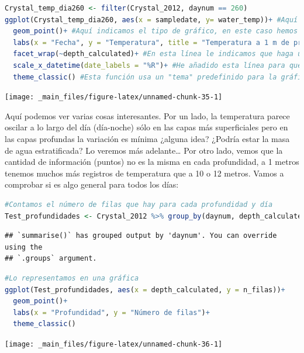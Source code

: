 \documentclass[
]{book}
\begin{document}
\begin{lstlisting}[language=R]
Crystal_temp_dia260 <- filter(Crystal_2012, daynum == 260)
ggplot(Crystal_temp_dia260, aes(x = sampledate, y= water_temp))+ #Aquí indicamos donde está la información que queremos representar (Crystal_2012) y que variables x e y
  geom_point()+ #Aquí indicamos el tipo de gráfico, en este caso hemos elegido puntos
  labs(x = "Fecha", y = "Temperatura", title = "Temperatura a 1 m de profundidad")+ #Aquí  podemos modificar las etiquetas del gráfico.
  facet_wrap(~depth_calculated)+ #En esta línea le indicamos que haga una gráfica por cada profundidad.
  scale_x_datetime(date_labels = "%R")+ #He añadido esta línea para que el formato de la fecha ponga solo la hora.
  theme_classic() #Esta función usa un "tema" predefinido para la gráfica
\end{lstlisting}

\texttt{[image: \_main\_files/figure-latex/unnamed-chunk-35-1]}

Aquí podemos ver varias cosas interesantes. Por un lado, la temperatura parece oscilar a lo largo del día (día-noche) sólo en las capas más superficiales pero en las capas profundas la variación es mínima ¿alguna idea? ¿Podría estar la masa de agua estratificada? Lo veremos más adelante\ldots{} Por otro lado, vemos que la cantidad de información (puntos) no es la misma en cada profundidad, a 1 metros tenemos muchos más registros de temperatura que a 10 o 12 metros. Vamos a comprobar si es algo general para todos los días:

\begin{lstlisting}[language=R]
#Contamos el número de filas que hay para cada profundidad y día
Test_profundidades <- Crystal_2012 %>% group_by(daynum, depth_calculated) %>% summarise(n_filas = n())
\end{lstlisting}

\begin{lstlisting}
## `summarise()` has grouped output by 'daynum'. You can override using the
## `.groups` argument.
\end{lstlisting}

\begin{lstlisting}[language=R]
#Lo representamos en una gráfica
ggplot(Test_profundidades, aes(x = depth_calculated, y = n_filas))+
  geom_point()+
  labs(x = "Profundidad", y = "Número de filas")+
  theme_classic()
\end{lstlisting}

\texttt{[image: \_main\_files/figure-latex/unnamed-chunk-36-1]}
\end{document}
